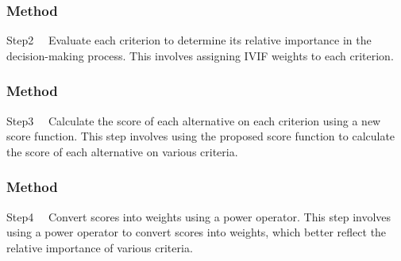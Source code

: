 \documentclass{beamer}
\begin{document}
\begin{frame}[fragile]
	\frametitle{Method}
        \begin{block}{Step2}
        \ \ Evaluate each criterion to determine its relative importance in the decision-making process. This involves assigning IVIF weights to each criterion.
        \end{block}
        
\end{frame}

\begin{frame}[fragile]
	\frametitle{Method}
        \begin{block}{Step3}
        \ \ Calculate the score of each alternative on each criterion using a new score function. This step involves using the proposed score function to calculate the score of each alternative on various criteria.
        \end{block}
        
\end{frame}
\begin{frame}[fragile]
	\frametitle{Method}
        \begin{block}{Step4}
        \ \ Convert scores into weights using a power operator. This step involves using a power operator to convert scores into weights, which better reflect the relative importance of various criteria.
        \end{block}
        
\end{frame}
\end{document}
